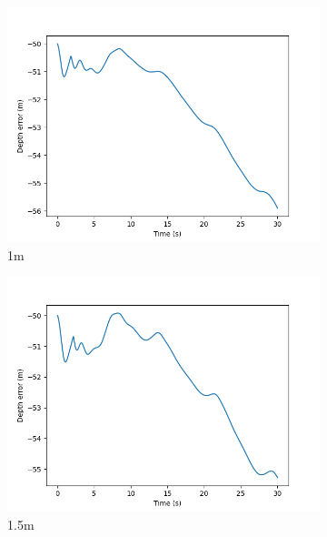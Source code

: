 \documentclass[class=article, crop=false]{standalone}
\begin{document}
\begin{figure}
\begin{subfigure}[b]{0.48\textwidth}
        \includegraphics{scenario1/rov-50m/1.0m/rov_depth_error_uncontrolled}
        \caption{1m}
        \label{}
    \end{subfigure}
    \hfill
    \begin{subfigure}[b]{0.48\textwidth}
        \centering
        \includegraphics{scenario1/rov-50m/1.5m/rov_depth_error_uncontrolled}
        \caption{1.5m}
        \label{}
    \end{subfigure}
    \vfill
    \begin{subfigure}[b]{0.48\textwidth}
        \centering

\end{subfigure}
\end{figure}
\end{document}
